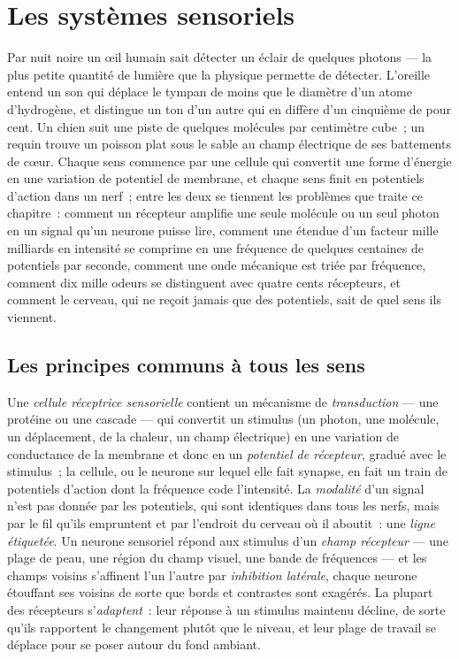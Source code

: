 \chapter{Les systèmes sensoriels}\label{ch:b3:sensory-systems}

Par nuit noire un œil humain sait détecter un éclair de quelques
photons --- la plus petite quantité de lumière que la physique permette
de détecter. L'oreille entend un son qui déplace le tympan de moins que
le diamètre d'un atome d'hydrogène, et distingue un ton d'un autre qui
en diffère d'un cinquième de pour cent. Un chien suit une piste de
quelques molécules par centimètre cube~; un requin trouve un poisson
plat sous le sable au champ électrique de ses battements de cœur. Chaque
sens commence par une cellule qui convertit une forme d'énergie en une
variation de potentiel de membrane, et chaque sens finit en potentiels
d'action dans un nerf~; entre les deux se tiennent les problèmes que
traite ce chapitre~: comment un récepteur amplifie une seule molécule ou
un seul photon en un signal qu'un neurone puisse lire, comment une
étendue d'un facteur mille milliards en intensité se comprime en une
fréquence de quelques centaines de potentiels par seconde, comment une
onde mécanique est triée par fréquence, comment dix mille odeurs se
distinguent avec quatre cents récepteurs, et comment le cerveau, qui ne
reçoit jamais que des potentiels, sait de quel sens ils viennent.

\section{Les principes communs à tous les sens}

\begin{definition}\label{def:b3:sensory-systems:principles}
Une \emph{cellule réceptrice sensorielle} contient un mécanisme de
\emph{transduction} --- une protéine ou une cascade --- qui convertit un
stimulus (un photon, une molécule, un déplacement, de la chaleur, un
champ électrique) en une variation de conductance de la membrane et donc
en un \emph{potentiel de récepteur}, gradué avec le stimulus~; la
cellule, ou le neurone sur lequel elle fait synapse, en fait un train de
potentiels d'action dont la fréquence code l'intensité. La
\emph{modalité} d'un signal n'est pas donnée par les potentiels, qui
sont identiques dans tous les nerfs, mais par le fil qu'ils empruntent
et par l'endroit du cerveau où il aboutit~: une \emph{ligne étiquetée}.
Un neurone sensoriel répond aux stimulus d'un \emph{champ récepteur} ---
une plage de peau, une région du champ visuel, une bande de fréquences
--- et les champs voisins s'affinent l'un l'autre par
\emph{inhibition latérale}, chaque neurone étouffant ses voisins de
sorte que bords et contrastes sont exagérés. La plupart des récepteurs
s'\emph{adaptent}~: leur réponse à un stimulus maintenu décline, de
sorte qu'ils rapportent le changement plutôt que le niveau, et leur
plage de travail se déplace pour se poser autour du fond ambiant.
\end{definition}

